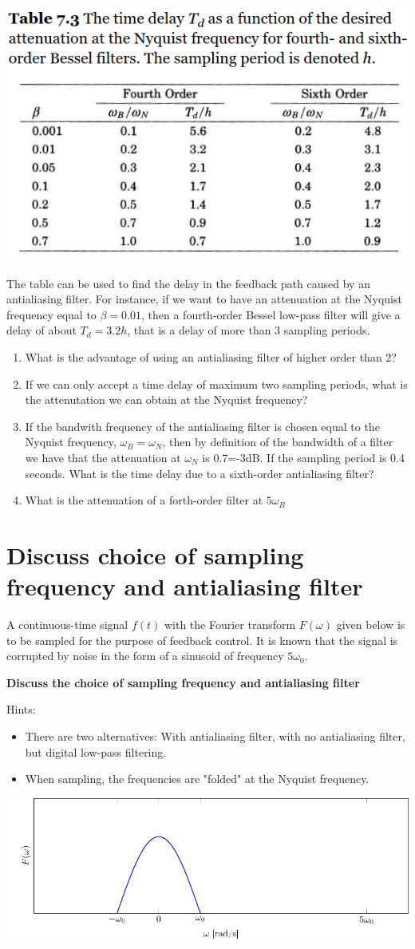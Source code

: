 \documentclass[letterpaper]{scrartcl}
\begin{document}
\begin{center}
\includegraphics[width=0.4\linewidth]{../../figures/Astrom-fig73.png}
\end{center}
The table can be used to find the delay in the feedback path caused by an antialiasing filter. For instance, if we want to have an attenuation at the Nyquist frequency equal to \(\beta = 0.01\), then a fourth-order Bessel low-pass filter will give a delay of about \(T_d = 3.2 h\), that is a delay of more than 3 sampling periods. 
\begin{enumerate}
\item What is the advantage of using an antialiasing filter of higher order than 2?
\item If we can only accept a time delay of maximum two sampling periods, what is the attenutation we can obtain at the Nyquist frequency?
\item If the bandwith frequency of the antialiasing filter is chosen equal to the Nyquist frequency, \(\omega_B = \omega_N\), then by definition of the bandwidth of a filter we have that the attenuation at \(\omega_N\) is 0.7=-3dB. If the sampling period is 0.4 seconds. What is the time delay due to a sixth-order antialiasing filter?
\item What is the attenuation of a forth-order filter at \(5\omega_B\)
\end{enumerate}

\section*{Discuss choice of sampling frequency and antialiasing filter}
\label{sec-3}
A continuous-time signal $f(t)$ with the Fourier transform $F(\omega)$ given below is to be sampled for the purpose of feedback control. It is known that the signal is corrupted by noise in the form of a sinusoid of frequency $5\omega_0$.

\textbf{Discuss the choice of sampling frequency and antialiasing filter}

Hints: 
\begin{itemize}
\item There are two alternatives: With antialiasing filter, with no antialiasing filter, but digital low-pass filtering.
\item When sampling, the frequencies are "folded" at the Nyquist frequency.
\end{itemize}

\begin{center}
\includegraphics[width=0.7\linewidth]{../../figures/choose-sampling-frequency}
\end{center}
\end{document}

